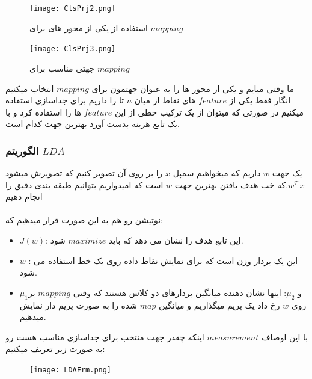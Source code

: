 \documentclass[12pt]{article}
\begin{document}
\begin{figure}[h]
    \centering
    \texttt{[image: ClsPrj2.png]}
    \caption{استفاده از یکی از محور های برای $mapping$}
    \label{fig:}
\end{figure}

\begin{figure}[h]
    \centering
    \texttt{[image: ClsPrj3.png]}
    \caption{جهتی مناسب برای $mapping$}
    \label{fig:}
\end{figure}


\clearpage

ما وقتی میایم و یکی از محور ها را به عنوان جهتمون برای $mapping$ انتخاب میکنیم انگار فقط یکی از $feature$ های نقاط از میان $n$ تا را داریم برای جداسازی استفاده میکنیم در صورتی که میتوان از یک ترکیب خطی از این  $feature$ ها را استفاده کرد و با یک تابع هزینه بدست آورد بهترین جهت کدام است.

\subsubsection{الگوریتم $LDA$}
یک جهت $w$ داریم که میخواهیم سمپل $x$ را بر روی آن تصویر کنیم که تصویرش میشود $w^T\:x$.که خب هدف یافتن بهترین جهت $w$ است که امیدواریم بتوانیم طبقه بندی دقیق را انجام دهیم
\\
\\
نوتیشن رو هم به این صورت قرار میدهیم که:    

\begin{itemize}
    \item $J(w)$: این تابع هدف را نشان می دهد که باید $maximize$ شود.

    \item $w$ : این یک بردار وزن است که برای نمایش نقاط داده روی یک خط استفاده می شود.
    
    \item $μ_1$و $μ_2$: اینها نشان دهنده میانگین بردارهای دو کلاس هستند که وقتی $mapping$ بر روی $w$ رخ داد یک پریم میگذاریم و میانگین $map$ شده را به صورت پریم دار نمایش میدهیم.
\end{itemize}

با این اوصاف $measurement$ اینکه چقدر جهت منتخب برای جداسازی مناسب هست رو به صورت زیر تعریف میکنیم:
\begin{figure}[h]
    \centering
    \texttt{[image: LDAFrm.png]}
    \label{fig:}
\end{figure}
\end{document}
